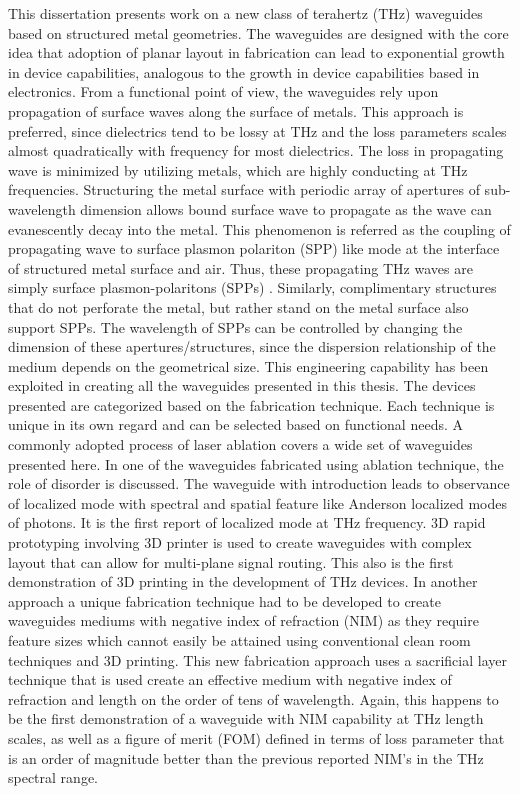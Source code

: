 This dissertation presents work on a new class of terahertz (THz) waveguides based on structured 
metal geometries. The waveguides are designed with the core idea that adoption of planar layout in 
fabrication can lead to exponential growth in device capabilities, analogous to the growth in device 
capabilities based in electronics. From a functional point of view, the waveguides rely upon 
propagation of surface waves along the surface of metals. This approach is preferred, since 
dielectrics tend to be lossy at THz and the loss parameters scales almost quadratically with 
frequency for most dielectrics. The loss in propagating wave is minimized by utilizing metals, 
which are highly conducting at THz frequencies. Structuring the metal surface with periodic array 
of apertures of sub-wavelength dimension allows bound surface wave to propagate as the wave can 
evanescently decay into the metal. This phenomenon is referred as the coupling of propagating wave 
to surface plasmon polariton (SPP) like mode at the interface of structured metal surface and air. 
Thus, these propagating THz waves are simply surface plasmon-polaritons (SPPs) . Similarly, 
complimentary structures that do not perforate the metal, but rather stand on the metal surface 
also support SPPs. The wavelength of SPPs can be controlled by changing the dimension of these 
apertures/structures, since the dispersion relationship of the medium depends on the geometrical size. 
This engineering capability has been exploited in creating all the waveguides presented in this thesis. 
The devices presented are categorized based on the fabrication technique. Each technique is unique 
in its own regard and can be selected based on functional needs. A commonly adopted process of laser 
ablation covers a wide set of waveguides presented here. In one of the waveguides fabricated using 
ablation technique, the role of disorder is discussed. The waveguide with introduction leads to 
observance of localized mode with spectral and spatial feature like Anderson localized modes of photons. 
It is the first report of localized mode at THz frequency. 3D rapid prototyping involving 3D printer is 
used to create waveguides with complex layout that can allow for multi-plane signal routing. 
This also is the first demonstration of 3D printing in the development of THz devices. In another 
approach a unique fabrication technique had to be developed to create waveguides mediums with negative 
index of refraction (NIM) as they require feature sizes which cannot easily be attained using conventional 
clean room techniques and 3D printing. This new fabrication approach uses a sacrificial layer technique 
that is used create an effective medium with negative index of refraction and length on the order of tens 
of wavelength. Again, this happens to be the first demonstration of a waveguide with NIM capability at 
THz length scales, as well as a figure of merit (FOM) defined in terms of loss parameter that is an order 
of magnitude better than the previous reported NIM’s in the THz spectral range.
